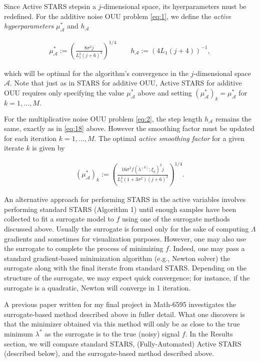 \documentclass{amsart}
\newcommand{\A}{\mathcal{A}}
\begin{document}
\vspace{.25cm}

Since Active STARS stepsin a $j$-dimensional space, its hyerparameters must be redefined. For the additive noise OUU problem \eqref{eq:1}, we define the \textit{active hyperparameters} $\mu_\A^*$ and $h_\A$

\begin{eqnarray} \label{eq:18}
\mu_\A^*:=\left( \frac{8\sigma^2 j}{L_1^2(j+6)^3}\right)^{1/4} \quad \quad h_\A:=(4L_1(j+4))^{-1},
\end{eqnarray} 

\noindent which will be optimal \cite{CW} for the algorithm's convergence in the $j$-dimensional space $\A.$ Note that just as in STARS for additive OUU, Active STARS for additive OUU requires only specifying the value $\mu_\A^*$ above and setting $(\mu^*_\A)_k=\mu_\A^*$ for $k=1,\ldots, M.$

For the multiplicative noise OUU problem \eqref{eq:2}, the step length $h_\A$ remains the same, exactly as in \eqref{eq:18} above. However the smoothing factor must be updated for each iteration $k=1,\ldots, M.$ The optimal \textit{active smoothing factor} for a given iterate $k$ is given by

\begin{eqnarray} \label{eq:19}
(\mu_\A^*)_k:=\left( \frac{16 \sigma^2 f(\lambda^{(k)};\xi_k)^2 j}{L_1^2(1+3\sigma^2)(j+6)^3}\right)^{1/4}.
\end{eqnarray} 

An alternative approach for performing STARS in the active variables involves performing standard STARS (Algorithm 1) until enough samples have been collected to fit a surrogate model to $f$ using one of the surrogate methods discussed above. Usually the surrogate is formed only for the sake of computing $\Lambda$ gradients and sometimes for visualization purposes. However, one may also use the surrogate to complete the process of minimizing $f$. Indeed, one may pass a standard gradient-based minimization algorithm (e.g., Newton solver) the surrogate along with the final iterate from standard STARS. Depending on the structure of the surrogate, we may expect quick convergence; for instance, if the surrogate is a quadratic, Newton will converge in 1 iteration.

A previous paper written for my final project in Math-6595 investigates the surrogate-based method described above in fuller detail. What one discovers is that the minimizer obtained via this method will only be as close to the true minimum $\lambda^*$ as the surrogate is to the true (noisy) signal $f$. In the Results section, we will compare standard STARS, (Fully-Automated) Active STARS (described below), and the surrogate-based method described above.
\end{document}
